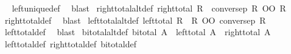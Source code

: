 \begin{isabellebody}
\isadelimproof
\ %
\endisadelimproof
%
\isatagproof
{}\isamarkupfalse%
\ left{\isacharunderscore}{\kern0pt}unique{\isacharunderscore}{\kern0pt}def\ \isamarkupfalse%
\ blast%
\endisatagproof
{\isafoldproof}%
%
\isadelimproof
%
\endisadelimproof
\isanewline
\isanewline
{}\isamarkupfalse%
\ right{\isacharunderscore}{\kern0pt}total{\isacharunderscore}{\kern0pt}alt{\isacharunderscore}{\kern0pt}def{\isacharcolon}{\kern0pt}\ {\isachardoublequoteopen}right{\isacharunderscore}{\kern0pt}total\ R\ {\isacharequal}{\kern0pt}\ {\isacharparenleft}{\kern0pt}conversep\ R\ OO\ R\ {\isasymge}\ {\isacharparenleft}{\kern0pt}{\isacharequal}{\kern0pt}{\isacharparenright}{\kern0pt}{\isacharparenright}{\kern0pt}{\isachardoublequoteclose}%
\isadelimproof
\ %
\endisadelimproof
%
\isatagproof
{}\isamarkupfalse%
\ right{\isacharunderscore}{\kern0pt}total{\isacharunderscore}{\kern0pt}def\ \isamarkupfalse%
\ blast%
\endisatagproof
{\isafoldproof}%
%
\isadelimproof
%
\endisadelimproof
\isanewline
{}\isamarkupfalse%
\ left{\isacharunderscore}{\kern0pt}total{\isacharunderscore}{\kern0pt}alt{\isacharunderscore}{\kern0pt}def{\isacharcolon}{\kern0pt}\ {\isachardoublequoteopen}left{\isacharunderscore}{\kern0pt}total\ R\ {\isacharequal}{\kern0pt}\ {\isacharparenleft}{\kern0pt}R\ OO\ conversep\ R\ {\isasymge}\ {\isacharparenleft}{\kern0pt}{\isacharequal}{\kern0pt}{\isacharparenright}{\kern0pt}{\isacharparenright}{\kern0pt}{\isachardoublequoteclose}%
\isadelimproof
\ %
\endisadelimproof
%
\isatagproof
{}\isamarkupfalse%
\ left{\isacharunderscore}{\kern0pt}total{\isacharunderscore}{\kern0pt}def\ \isamarkupfalse%
\ blast%
\endisatagproof
{\isafoldproof}%
%
\isadelimproof
%
\endisadelimproof
\isanewline
\isanewline
{}\isamarkupfalse%
\ bi{\isacharunderscore}{\kern0pt}total{\isacharunderscore}{\kern0pt}alt{\isacharunderscore}{\kern0pt}def{\isacharcolon}{\kern0pt}\ {\isachardoublequoteopen}bi{\isacharunderscore}{\kern0pt}total\ A\ {\isacharequal}{\kern0pt}\ {\isacharparenleft}{\kern0pt}left{\isacharunderscore}{\kern0pt}total\ A\ {\isasymand}\ right{\isacharunderscore}{\kern0pt}total\ A{\isacharparenright}{\kern0pt}{\isachardoublequoteclose}\isanewline
%
\isadelimproof
%
\endisadelimproof
%
\isatagproof
{}\isamarkupfalse%
\ left{\isacharunderscore}{\kern0pt}total{\isacharunderscore}{\kern0pt}def\ right{\isacharunderscore}{\kern0pt}total{\isacharunderscore}{\kern0pt}def\ bi{\isacharunderscore}{\kern0pt}total{\isacharunderscore}{\kern0pt}def\ \isamarkupfalse%

\end{isabellebody}
